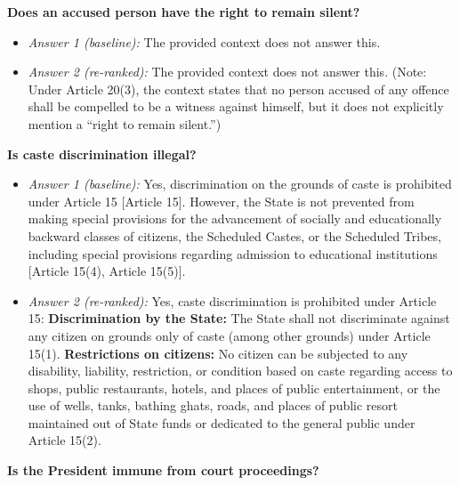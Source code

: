 \documentclass[10pt,a4paper]{article}
\begin{document}
\textbf{Does an accused person have the right to remain silent?}
\begin{itemize}[nosep,leftmargin=1.2em]
\item \emph{Answer 1 (baseline):} The provided context does not answer this.
\item \emph{Answer 2 (re-ranked):} The provided context does not answer this. (Note: Under Article 20(3), the context states that no person accused of any offence shall be compelled to be a witness against himself, but it does not explicitly mention a ``right to remain silent.'')
\end{itemize}
\textbf{Is caste discrimination illegal?}
\begin{itemize}[nosep,leftmargin=1.2em]
\item \emph{Answer 1 (baseline):} Yes, discrimination on the grounds of caste is prohibited under Article 15 [Article 15]. However, the State is not prevented from making special provisions for the advancement of socially and educationally backward classes of citizens, the Scheduled Castes, or the Scheduled Tribes, including special provisions regarding admission to educational institutions [Article 15(4), Article 15(5)].
\item \emph{Answer 2 (re-ranked):} Yes, caste discrimination is prohibited under Article 15: \textbullet{} \textbf{Discrimination by the State:} The State shall not discriminate against any citizen on grounds only of caste (among other grounds) under Article 15(1). \textbullet{} \textbf{Restrictions on citizens:} No citizen can be subjected to any disability, liability, restriction, or condition based on caste regarding access to shops, public restaurants, hotels, and places of public entertainment, or the use of wells, tanks, bathing ghats, roads, and places of public resort maintained out of State funds or dedicated to the general public under Article 15(2).
\end{itemize}
\textbf{Is the President immune from court proceedings?}
\end{document}
